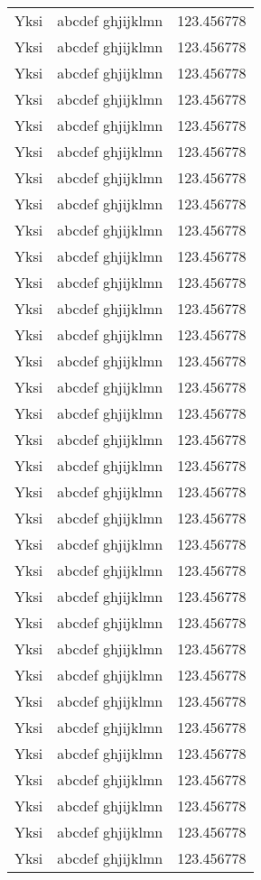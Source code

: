 \documentclass{LUT_pohja}[2016/03/09 LUT Dippa Pohja]
\begin{document}
\begin{appendices}
\begin{longtable}[l]{|l|l|l|}
Yksi & abcdef ghjijklmn & 123.456778 \\
Yksi & abcdef ghjijklmn & 123.456778 \\
Yksi & abcdef ghjijklmn & 123.456778 \\
Yksi & abcdef ghjijklmn & 123.456778 \\
Yksi & abcdef ghjijklmn & 123.456778 \\
Yksi & abcdef ghjijklmn & 123.456778 \\
Yksi & abcdef ghjijklmn & 123.456778 \\
Yksi & abcdef ghjijklmn & 123.456778 \\
Yksi & abcdef ghjijklmn & 123.456778 \\
Yksi & abcdef ghjijklmn & 123.456778 \\
Yksi & abcdef ghjijklmn & 123.456778 \\
Yksi & abcdef ghjijklmn & 123.456778 \\
Yksi & abcdef ghjijklmn & 123.456778 \\
Yksi & abcdef ghjijklmn & 123.456778 \\
Yksi & abcdef ghjijklmn & 123.456778 \\
Yksi & abcdef ghjijklmn & 123.456778 \\
Yksi & abcdef ghjijklmn & 123.456778 \\
Yksi & abcdef ghjijklmn & 123.456778 \\
Yksi & abcdef ghjijklmn & 123.456778 \\
Yksi & abcdef ghjijklmn & 123.456778 \\
Yksi & abcdef ghjijklmn & 123.456778 \\
Yksi & abcdef ghjijklmn & 123.456778 \\
Yksi & abcdef ghjijklmn & 123.456778 \\
Yksi & abcdef ghjijklmn & 123.456778 \\
Yksi & abcdef ghjijklmn & 123.456778 \\
Yksi & abcdef ghjijklmn & 123.456778 \\
Yksi & abcdef ghjijklmn & 123.456778 \\
Yksi & abcdef ghjijklmn & 123.456778 \\
Yksi & abcdef ghjijklmn & 123.456778 \\
Yksi & abcdef ghjijklmn & 123.456778 \\
Yksi & abcdef ghjijklmn & 123.456778 \\
Yksi & abcdef ghjijklmn & 123.456778 \\
Yksi & abcdef ghjijklmn & 123.456778 \\

\end{longtable}
\end{appendices}
\end{document}
